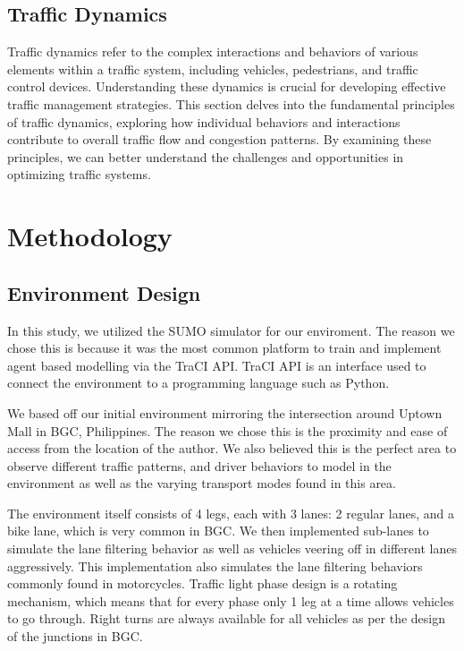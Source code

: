 \subsection{Traffic Dynamics}
Traffic dynamics refer to the complex interactions and behaviors of various elements within a traffic system, including vehicles, pedestrians, and traffic control devices. Understanding these dynamics is crucial for developing effective traffic management strategies. This section delves into the fundamental principles of traffic dynamics, exploring how individual behaviors and interactions contribute to overall traffic flow and congestion patterns. By examining these principles, we can better understand the challenges and opportunities in optimizing traffic systems.

\section{Methodology}

\subsection{Environment Design}
In this study, we utilized the SUMO simulator for our enviroment. The reason we chose this is because it was the most common platform to train and implement agent based modelling via the TraCI API. TraCI API is an interface used to connect the environment to a programming language such as Python.


We based off our initial environment mirroring the intersection around Uptown Mall in BGC, Philippines. The reason we chose this is the proximity and ease of access from the location of the author. We also believed this is the perfect area to observe different traffic patterns, and driver behaviors to model in the environment as well as the varying transport modes found in this area.

The environment itself consists of 4 legs, each with 3 lanes: 2 regular lanes, and a bike lane, which is very common in BGC. We then implemented sub-lanes to simulate the lane filtering behavior as well as vehicles veering off in different lanes aggressively. This implementation also simulates the lane filtering behaviors commonly found in motorcycles. Traffic light phase design is a rotating mechanism, which means that for every phase only 1 leg at a time allows vehicles to go through. Right turns are always available for all vehicles as per the design of the junctions in BGC. 

